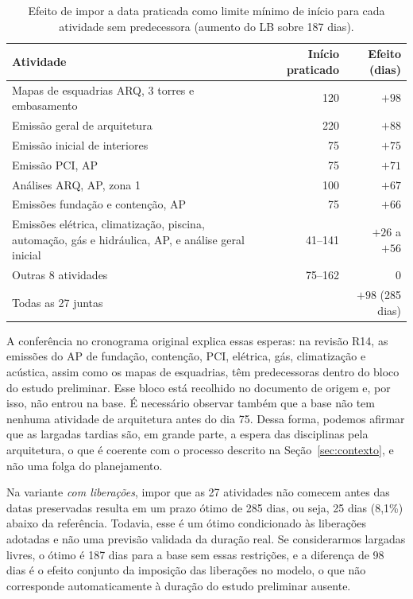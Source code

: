 \begin{table}[htbp]
  \centering
  \caption{Efeito de impor a data praticada como limite mínimo de início
  para cada atividade sem predecessora (aumento do LB sobre 187 dias).}
  \label{tab:largadas}
  \small
  \begin{tabularx}{\linewidth}{Xrr}
    \toprule
    Atividade & Início praticado & Efeito (dias) \\
    \midrule
    Mapas de esquadrias ARQ, 3 torres e embasamento & 120 & $+98$ \\
    Emissão geral de arquitetura & 220 & $+88$ \\
    Emissão inicial de interiores & 75 & $+75$ \\
    Emissão PCI, AP & 75 & $+71$ \\
    Análises ARQ, AP, zona 1 & 100 & $+67$ \\
    Emissões fundação e contenção, AP & 75 & $+66$ \\
    Emissões elétrica, climatização, piscina, automação, gás e
      hidráulica, AP, e análise geral inicial & 41--141 & $+26$ a $+56$ \\
    Outras 8 atividades & 75--162 & 0 \\
    \midrule
    Todas as 27 juntas & & $+98$ (285 dias) \\
    \bottomrule
  \end{tabularx}
\end{table}

A conferência no cronograma original explica essas esperas: na revisão
R14, as emissões do AP de fundação, contenção, PCI, elétrica, gás,
climatização e acústica, assim como os mapas de esquadrias, têm
predecessoras dentro do bloco do estudo preliminar. Esse bloco está
recolhido no documento de origem e, por isso, não entrou na base. É necessário observar também que a base
não tem nenhuma atividade de arquitetura antes do dia 75. Dessa forma, podemos afirmar que as largadas
tardias são, em grande parte, a espera das disciplinas pela arquitetura,
o que é coerente com o processo descrito na Seção~\ref{sec:contexto}, e
não uma folga do planejamento.

Na variante \emph{com liberações}, impor que as 27 atividades não comecem
antes das datas preservadas resulta em um prazo ótimo de 285 dias, ou seja, 25 dias
(8,1\%) abaixo da referência. Todavia, esse é um ótimo condicionado às liberações
adotadas e não uma previsão validada da duração real. Se considerarmos largadas livres,
o ótimo é 187 dias para a base sem essas restrições, e a diferença de 98 dias
é o efeito conjunto da imposição das liberações no modelo, o que não corresponde
automaticamente à duração do estudo preliminar ausente.

